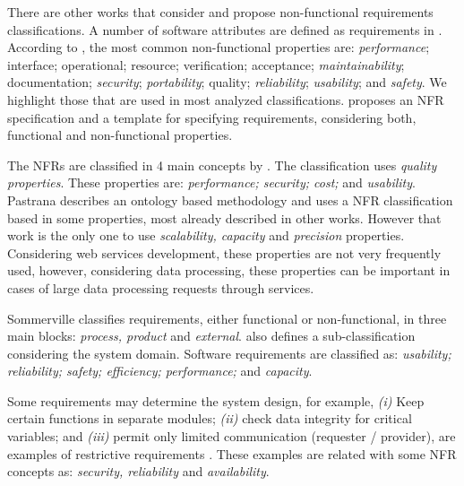 \documentclass{sig-alternate}
\begin{document}
There are other works
\cite{ieee_1998,CysneirosLN01,Cleland-HuangSZS06,Glinz05rethinkingthe,sommerville08}
that consider and propose non-functional requirements classifications. A number
of software attributes are defined as requirements in
\cite{sommerville08,ieee_1998}. According to \cite{ieee_1998}, the most common
non-functional properties are: \textit{performance}; interface; operational;
resource; verification; acceptance; \textit{maintainability}; documentation;
\textit{security}; \textit{portability}; quality; \textit{reliability};
\textit{usability}; and \textit{safety}. We highlight those that are used in
most analyzed classifications. \cite{ieee_1998} proposes an NFR specification
and a template for specifying requirements, considering both, functional and
non-functional properties.

The NFRs are classified in 4 main concepts by \cite{CysneirosLN01}. The
classification uses \textit{quality properties}. These properties are:
\textit{performance; security; cost;} and \textit{usability}. Pastrana
\cite{PastranaPK11} describes an ontology based methodology and uses a NFR
classification based in some properties, most already described in other works.
However that work is the only one to use \textit{scalability, capacity}
and \textit{precision} properties. Considering web services development,
these properties are not very frequently used, however, considering data
processing, these properties can be important in cases of large data processing
requests through services.

Sommerville \cite{sommerville08} classifies requirements,
either functional or non-functional, in three main blocks:
\textit{process, product} and \textit{external}. \cite{sommerville08} 
also defines a sub-classification considering the system domain.
Software requirements are classified as: \textit{usability; reliability; safety;
efficiency; performance;} and \textit{capacity}.  
   



Some requirements may determine the system design, for example, \textit{(i)}
Keep certain functions in separate modules; \textit{(ii)} check data integrity
for critical variables; and \textit{(iii)} permit only limited communication
(requester / provider), are examples of restrictive requirements
\cite{ieee_1998}. These examples are related with some NFR concepts as: \textit{security, reliability} and
\textit{availability}. 
\end{document}
